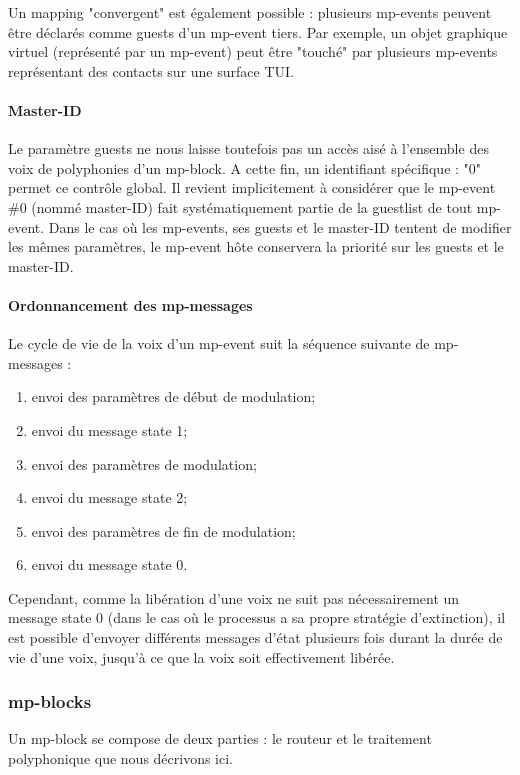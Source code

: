 Un mapping "convergent" est également possible : plusieurs mp-events peuvent être déclarés comme guests d'un mp-event tiers. Par exemple, un objet graphique virtuel (représenté par un mp-event) peut être "touché" par plusieurs mp-events représentant des contacts sur une surface \gls{TUI}.

\paragraph{Master-ID}
Le paramètre guests ne nous laisse toutefois pas un accès aisé à l'ensemble des voix de polyphonies d'un mp-block. A cette fin, un identifiant spécifique : "0" permet ce contrôle global. Il revient implicitement à considérer que le mp-event \#0 (nommé master-ID) fait systématiquement partie de la guestlist de tout mp-event. Dans le cas où les mp-events, ses guests et le master-ID tentent de modifier les mêmes paramètres, le mp-event hôte conservera la priorité sur les guests et le master-ID.

\paragraph{Ordonnancement des mp-messages}
Le cycle de vie de la voix d'un mp-event suit la séquence suivante de mp-messages :
\vspace{-1em}
\begin{enumerate}[noitemsep]
	\item envoi des paramètres de début de modulation;
	\item envoi du message state 1;
	\item envoi des paramètres de modulation;
	\item envoi du message state 2;
	\item envoi des paramètres de fin de modulation;
	\item envoi du message state 0.
\end{enumerate}
Cependant, comme la libération d'une voix ne suit pas nécessairement un message state 0 (dans le cas où le processus a sa propre stratégie d'extinction), il est possible d'envoyer différents messages d'état plusieurs fois durant la durée de vie d'une voix, jusqu'à ce que la voix soit effectivement libérée.

\subsubsection{mp-blocks}
Un mp-block se compose de deux parties : le routeur et le traitement polyphonique que nous décrivons ici.
